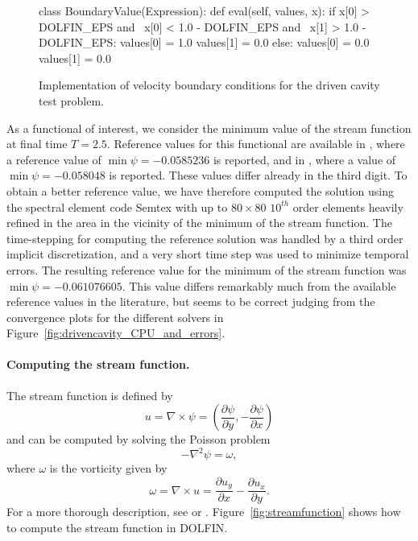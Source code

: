 \begin{figure}
\bwfig
  \begin{python}
class BoundaryValue(Expression):
    def eval(self, values, x):
        if x[0] > DOLFIN_EPS and \
           x[0] < 1.0 - DOLFIN_EPS and \
           x[1] > 1.0 - DOLFIN_EPS:
            values[0] = 1.0
            values[1] = 0.0
        else:
            values[0] = 0.0
            values[1] = 0.0
  \end{python}
  \caption{Implementation of velocity boundary conditions for the
    driven cavity test problem.}
  \label{fig:bc_drivencavity}
\end{figure}

As a functional of interest, we consider the minimum value of the
stream function at final time $T = 2.5$. Reference values for this
functional are available in \citet{PanditKalitaDalal2007}, where a
reference value of $\min\psi = -0.0585236$ is reported, and
in \citet{ChudanovPopkovChurbanovEtAl2007}, where a value of $\min\psi
= -0.058048$ is reported. These values differ already in the third
digit. To obtain a better reference value, we have therefore
computed the solution using the spectral element code Semtex \citep{Blackburn2009,Blackburn2004}
with up to $80 \times 80$ $10^{th}$ order elements heavily refined in
the area in the vicinity of the minimum of the stream function. The
time-stepping for computing the reference solution was handled by a
third order implicit discretization, and a very short time step was used
to minimize temporal errors. The resulting reference value for the
minimum of the stream function was $\min\psi =-0.061076605$. This
value differs remarkably much from the available reference values in
the literature, but seems to be correct judging from the convergence
plots for the different solvers in
Figure~\ref{fig:drivencavity_CPU_and_errors}.

\paragraph{Computing the stream function.}

The stream function is defined by
\begin{equation}
  u = \nabla \times \psi
  = (\frac{\partial{\psi}}{\partial{y}}, -\frac{\partial{\psi}}{\partial{x}})
\end{equation}
and can be computed by solving the Poisson problem
\begin{equation}
  -\nabla^2 \psi = \omega,
 \end{equation}
where $\omega$ is the vorticity given by
\begin{equation}
  \omega = \nabla \times u
  = \frac{\partial{u_y}}{\partial{x}} - \frac{\partial{u_x}}{\partial{y}}.
\end{equation}
For a more thorough description, see \citet{White1999}
or \citet{White1991}. Figure~\ref{fig:streamfunction} shows how to
compute the stream function in DOLFIN.

